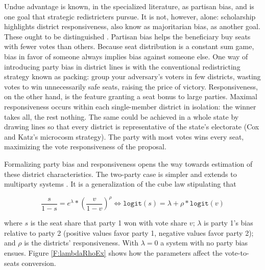 \documentclass[letter,12pt]{article}
\begin{document}
Undue advantage is known, in the specialized literature, as partisan bias, and is one goal that strategic redistricters pursue. It is not, however, alone: scholarship highlights district responsiveness, also know as majoritarian bias, as another goal. These ought to be distinguished \citep[this paragraph draws heavily on][, ch.\ 3]{cox.katz.2002}. Partisan bias helps the beneficiary buy seats with fewer votes than others. Because seat distribution is a constant sum game, bias in favor of someone always implies bias against someone else. One way of introducing party bias in district lines is with the conventional redistricting strategy known as packing: group your adversary's voters in few districts, wasting votes to win unnecessarily safe seats, raising the price of victory. Responsiveness, on the other hand, is the feature granting a seat bonus to large parties. Maximal responsiveness occurs within each single-member district in isolation: the winner takes all, the rest nothing. The same could be achieved in a whole state by drawing lines so that every district is representative of the state's electorate (Cox and Katz's microcosm strategy). The party with most votes wins every seat, maximizing the vote responsiveness of the proposal. 

Formalizing party bias and responsiveness opens the way towards estimation of these district characteristics. The two-party case is simpler and extends to multiparty systems \citep{taagepera.CubeLaw.1973,tufte1973seatsVotes,king.browning1987biasRespUS}. It is a generalization of the cube law stipulating that 

\begin{equation}
 \frac{s}{1-s} = e^\lambda *  \left(\frac{v}{1-v}\right)^\rho \iff
 \texttt{logit}(s) = \lambda + \rho *  \texttt{logit}(v)
\end{equation}\label{E:cubeLaw}

\noindent where $s$ is the seat share that party 1 won with vote share $v$; $\lambda$ is party 1's bias relative to party 2 (positive values favor party 1, negative values favor party 2); and $\rho$ is the districts' responsiveness. With $\lambda=0$ a system with no party bias ensues. Figure \ref{F:lambdaRhoEx} shows how the parameters affect the vote-to-seats conversion. 

\end{document}
